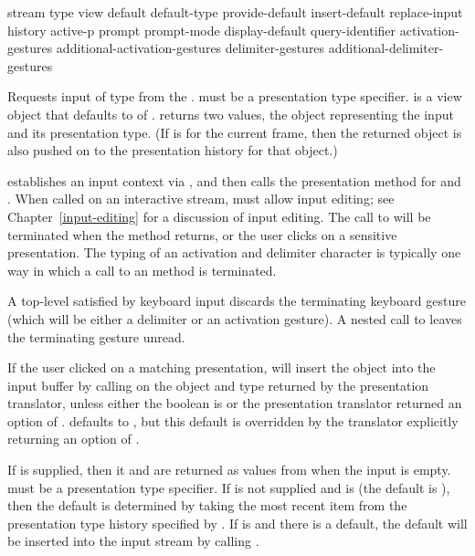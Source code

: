  {stream type
                   \key view 
                        default default-type provide-default 
                        insert-default replace-input history active-p
                        prompt prompt-mode display-default query-identifier
                        activation-gestures additional-activation-gestures
                        delimiter-gestures additional-delimiter-gestures}

Requests input of type  from the  .
 must be a presentation type specifier.   is a view object
that defaults to  of .  
returns two values, the object representing the input and its presentation type.
(If  is  for the current
frame, then the returned object is also pushed on to the presentation history
for that object.)

 establishes an input context via , and then
calls the  presentation method for  and .  When
called on an interactive stream,  must allow input editing; see
Chapter~\ref{input-editing} for a discussion of input editing.  The call to
 will be terminated when the  method returns, or the user
clicks on a sensitive presentation.  The typing of an activation and delimiter
character is typically one way in which a call to an  method is
terminated.

A top-level  satisfied by keyboard input discards the terminating
keyboard gesture (which will be either a delimiter or an activation gesture).
A nested call to  leaves the terminating gesture unread.

If the user clicked on a matching presentation,  will insert
the object into the input buffer by calling  on
the object and type returned by the presentation translator, unless either the
boolean  is  or the presentation translator
returned an  option of .   defaults to
, but this default is overridden by the translator explicitly
returning an  option of .

If  is supplied, then it and  are returned as
values from  when the input is empty.  
must be a presentation type specifier.  If  is not supplied and
 is  (the default is ), then the
default is determined by taking the most recent item from the presentation type
history specified by .  If  is  and
there is a default, the default will be inserted into the input stream by
calling .

